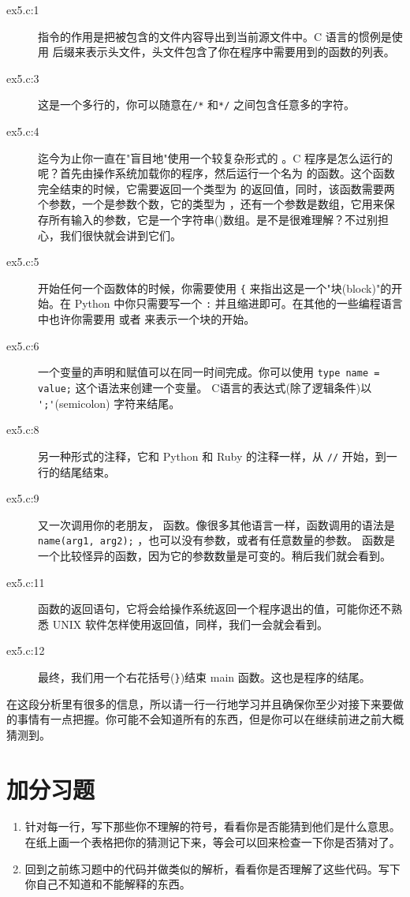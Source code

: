 \begin{description}
\item[ex5.c:1]  指令的作用是把被包含的文件内容导出到当前源文件中。C 语言的惯例是使用  后缀来表示头文件，头文件包含了你在程序中需要用到的函数的列表。
\item[ex5.c:3] 这是一个多行的，你可以随意在\verb|/*| 和\verb|*/| 之间包含任意多的字符。
\item[ex5.c:4] 迄今为止你一直在"盲目地"使用一个较复杂形式的 。C 程序是怎么运行的呢？首先由操作系统加载你的程序，然后运行一个名为  的函数。这个函数完全结束的时候，它需要返回一个类型为  的返回值，同时，该函数需要两个参数，一个是参数个数，它的类型为 ，还有一个参数是数组，它用来保存所有输入的参数，它是一个字符串()数组。是不是很难理解？不过别担心，我们很快就会讲到它们。
\item[ex5.c:5] 开始任何一个函数体的时候，你需要使用 \verb|{| 来指出这是一个"块(block)"的开始。在 Python 中你只需要写一个 \verb|:| 并且缩进即可。在其他的一些编程语言中也许你需要用  或者  来表示一个块的开始。
\item[ex5.c:6] 一个变量的声明和赋值可以在同一时间完成。你可以使用 \verb|type name = value;| 这个语法来创建一个变量。
    C语言的表达式(除了逻辑条件)以 \verb|';'|(semicolon) 字符来结尾。
\item[ex5.c:8] 另一种形式的注释，它和 Python 和 Ruby 的注释一样，从 \verb|//| 开始，到一行的结尾结束。
\item[ex5.c:9] 又一次调用你的老朋友， 函数。像很多其他语言一样，函数调用的语法是 \verb|name(arg1, arg2);| ，也可以没有参数，或者有任意数量的参数。 函数是一个比较怪异的函数，因为它的参数数量是可变的。稍后我们就会看到。
\item[ex5.c:11] 函数的返回语句，它将会给操作系统返回一个程序退出的值，可能你还不熟悉 UNIX 软件怎样使用返回值，同样，我们一会就会看到。
\item[ex5.c:12] 最终，我们用一个右花括号(\verb|}|)结束 main 函数。这也是程序的结尾。
\end{description}

在这段分析里有很多的信息，所以请一行一行地学习并且确保你至少对接下来要做的事情有一点把握。你可能不会知道所有的东西，但是你可以在继续前进之前大概猜测到。

\section{加分习题}

\begin{enumerate}
\item 针对每一行，写下那些你不理解的符号，看看你是否能猜到他们是什么意思。在纸上画一个表格把你的猜测记下来，等会可以回来检查一下你是否猜对了。
\item 回到之前练习题中的代码并做类似的解析，看看你是否理解了这些代码。写下你自己不知道和不能解释的东西。
\end{enumerate}
